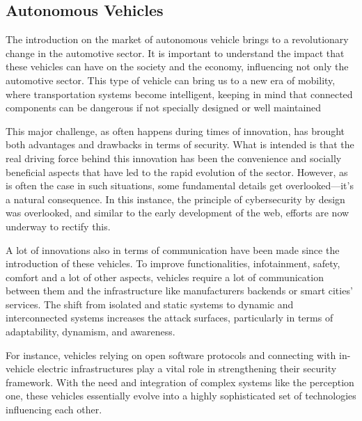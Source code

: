 \subsection{Autonomous Vehicles}\label{subsec:autonomous-vehicles}

The introduction on the market of autonomous vehicle brings to a revolutionary change in the automotive sector.
It is important to understand the impact that these vehicles can have on the society and the economy, influencing not only the automotive sector.
This type of vehicle can bring us to a new era of mobility, where transportation systems become intelligent, keeping in mind that connected components can be dangerous if not specially designed or well maintained\cite{schneier2014iot}

This major challenge, as often happens during times of innovation, has brought both advantages and drawbacks in terms of security.
What is intended is that the real driving force behind this innovation has been the convenience and socially beneficial aspects that have led to the rapid evolution of the sector.
However, as is often the case in such situations, some fundamental details get overlooked—it's a natural consequence.
In this instance, the principle of cybersecurity by design was overlooked\cite{sec-by-design}, and similar to the early development of the web, efforts are now underway to rectify this.

A lot of innovations also in terms of communication have been made since the introduction of these vehicles.
To improve functionalities, infotainment, safety, comfort and a lot of other aspects, vehicles require a lot of communication between them and the infrastructure like manufacturers backends or smart cities' services.
The shift from isolated and static systems to dynamic and interconnected systems increases the attack surfaces, particularly in terms of adaptability, dynamism, and awareness\cite{connected_vehicles_security_2023, bouchouia2023survey}.

For instance, vehicles relying on open software protocols and connecting with in-vehicle electric infrastructures play a vital role in strengthening their security framework.
With the need and integration of complex systems like the perception one, these vehicles essentially evolve into a highly sophisticated set of technologies influencing each other\cite{sec-by-design}.

